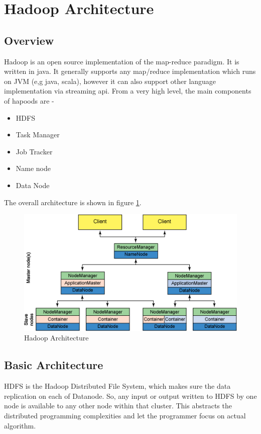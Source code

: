 \documentclass{article}
\begin{document}
\section{Hadoop Architecture}
\subsection {Overview}
Hadoop is an open source implementation of the map-reduce paradigm. It is written in java. It generally supports any map/reduce implementation which runs on JVM (e,g java, scala), however it can also support other language implementation via streaming api. From a very high level, the main components of hapoods are -
\begin{itemize}
\item HDFS
\item Task Manager
\item Job Tracker
\item Name node
\item Data Node
\end{itemize}

The overall architecture is shown in figure \ref{fig:hadoop-arch}\cite{hadoopibm}.

\begin{figure}[h]
	\centering
	\includegraphics[width=\textwidth]{hadoop-arch}
	\caption{Hadoop Architecture}
	\label{fig:hadoop-arch}
\end{figure}

\subsection {Basic Architecture}

HDFS is the Hadoop Distributed File System, which makes sure the data replication on each of Datanode. So, any input or output written to HDFS by one node is available to any other node within that cluster. This abstracts the distributed programming complexities and let the programmer focus on actual algorithm.
\end{document}
